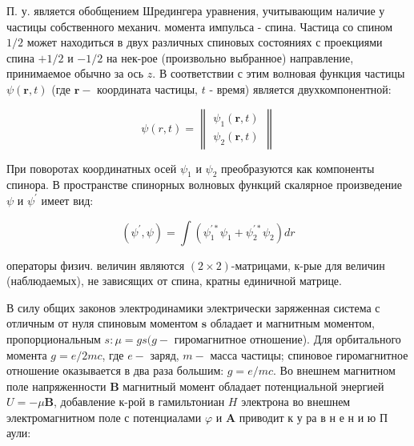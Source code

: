 \documentclass[10pt]{article}
\begin{document}
П. у. является обобщением Шредингера уравнения, учитывающим наличие у частицы собственного механич. момента импульса - спина. Частица со спином $1 / 2$ может находиться в двух различных спиновых состояниях с проекциями спина $+1 / 2$ и $-1 / 2$ на нек-рое (произвольно выбранное) направление, принимаемое обычно за ось $z$. В соответствии с этим волновая функция частицы $\psi(\boldsymbol{r}, t)$ (где $\boldsymbol{r}-$ координата частицы, $t$ - время) является двухкомпонентной:



\[

\psi(r, t)=\left\|\begin{array}{l}

\psi_{1}(\boldsymbol{r}, t) \\

\psi_{2}(\boldsymbol{r}, t)

\end{array}\right\|

\]



При поворотах координатных осей $\psi_{1}$ и $\psi_{2}$ преобразуются как компоненты спинора. В пространстве спинорных волновых функций скалярное произведение $\psi$ и $\psi^{\prime}$ имеет вид:



\[

\left(\psi^{\prime}, \psi\right)=\int\left(\psi_{1}^{\prime *} \psi_{1}+\psi_{2}^{\prime *} \psi_{2}\right) d r

\]



операторы физич. величин являются $(2 \times 2)$-матрицами, к-рые для величин (наблюдаемых), не зависящих от спина, кратны единичной матрице.



В силу общих законов электродинамики электрически заряженная система с отличным от нуля спиновым моментом $\boldsymbol{s}$ обладает и магнитным моментом, пропорциональным $s: \mu=g s(g-$ гиромагнитное отношение). Для орбитального момента $g=e / 2 m c$, где $e-$ заряд, $m-$ масса частицы; спиновое гиромагнитное отношение оказывается в два раза большим: $g=e / m c$. Во внешнем магнитном поле напряженности $\boldsymbol{B}$ магнитный момент обладает потенциальной энергией $U=-\mu \boldsymbol{B}$, добавление к-рой в гамильтониан $H$ электрона во внешнем электромагнитном поле с потенциалами $\varphi$ и $\boldsymbol{A}$ приводит к у ра в н е н и ю П аули:
\end{document}
